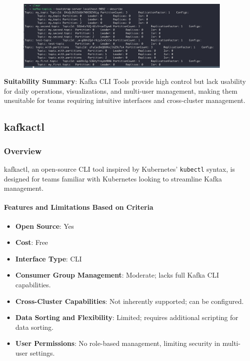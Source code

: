 \documentclass[10pt , a4paper]{report}
\begin{document}
\begin{figure}[htbp]
  \begin{center}
    \includegraphics[width=0.95\textwidth]{imgs/KafkaCLI.png}
  \end{center}
  \caption{}\label{fig:}
\end{figure}


\textbf{Suitability Summary}: Kafka CLI Tools provide high control but lack usability for daily operations, visualizations, and multi-user management, making them unsuitable for teams requiring intuitive interfaces and cross-cluster management.

\subsection{kafkactl} 
\subsubsection*{Overview} 
kafkactl, an open-source CLI tool inspired by Kubernetes’ \texttt{kubectl} syntax, is designed for teams familiar with Kubernetes looking to streamline Kafka management.

\paragraph{Features and Limitations Based on Criteria}
\begin{itemize} 
    \item \small \textbf{Open Source}: Yes
    \item \small \textbf{Cost}: Free
    \item \small \textbf{Interface Type}: CLI
    \item \small \textbf{Consumer Group Management}: Moderate; lacks full Kafka CLI capabilities.
    \item \small \textbf{Cross-Cluster Capabilities}: Not inherently supported; can be configured.
    \item \small \textbf{Data Sorting and Flexibility}: Limited; requires additional scripting for data sorting.
    \item \small \textbf{User Permissions}: No role-based management, limiting security in multi-user settings.
\end{itemize}
\end{document}
